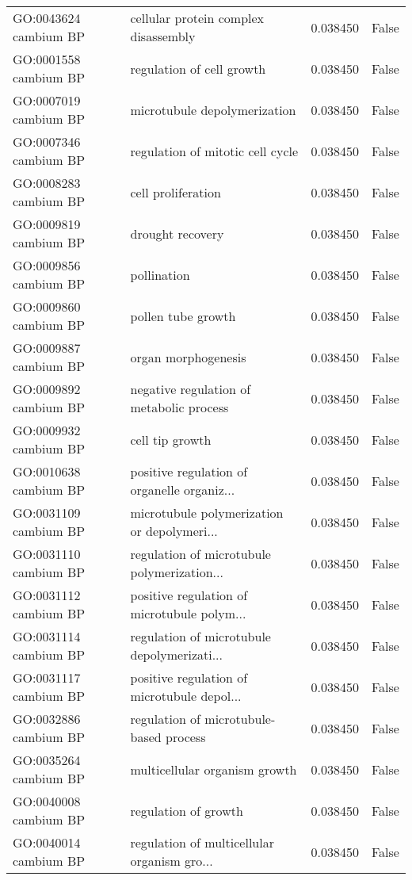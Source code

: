 \begin{tabular}{llrl}
GO:0043624 cambium BP       &  cellular protein complex disassembly &  0.038450 &  False \\
GO:0001558 cambium BP       &  regulation of cell growth &  0.038450 &  False \\
GO:0007019 cambium BP       &  microtubule depolymerization &  0.038450 &  False \\
GO:0007346 cambium BP       &  regulation of mitotic cell cycle &  0.038450 &  False \\
GO:0008283 cambium BP       &  cell proliferation &  0.038450 &  False \\
GO:0009819 cambium BP       &  drought recovery &  0.038450 &  False \\
GO:0009856 cambium BP       &  pollination &  0.038450 &  False \\
GO:0009860 cambium BP       &  pollen tube growth &  0.038450 &  False \\
GO:0009887 cambium BP       &  organ morphogenesis &  0.038450 &  False \\
GO:0009892 cambium BP       &  negative regulation of metabolic process &  0.038450 &  False \\
GO:0009932 cambium BP       &  cell tip growth &  0.038450 &  False \\
GO:0010638 cambium BP       &  positive regulation of organelle organiz... &  0.038450 &  False \\
GO:0031109 cambium BP       &  microtubule polymerization or depolymeri... &  0.038450 &  False \\
GO:0031110 cambium BP       &  regulation of microtubule polymerization... &  0.038450 &  False \\
GO:0031112 cambium BP       &  positive regulation of microtubule polym... &  0.038450 &  False \\
GO:0031114 cambium BP       &  regulation of microtubule depolymerizati... &  0.038450 &  False \\
GO:0031117 cambium BP       &  positive regulation of microtubule depol... &  0.038450 &  False \\
GO:0032886 cambium BP       &  regulation of microtubule-based process &  0.038450 &  False \\
GO:0035264 cambium BP       &  multicellular organism growth &  0.038450 &  False \\
GO:0040008 cambium BP       &  regulation of growth &  0.038450 &  False \\
GO:0040014 cambium BP       &  regulation of multicellular organism gro... &  0.038450 &  False \\

\end{tabular}
